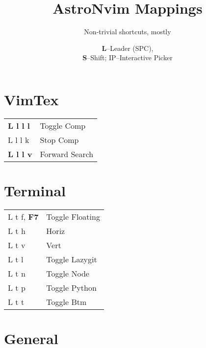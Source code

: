 \documentclass[
  ,landscape
  ,columns=4
]{cheatsheet}
\title{AstroNvim Mappings}
\author{Non-trivial shortcuts, mostly}
\date{\textbf{L}--Leader (SPC),\\\textbf{S}--Shift; IP--Interactive Picker}
\begin{document}
\maketitle

\section{VimTex}

\begin{tabular}{ll}
	\textbf{L l l l} & Toggle Comp    \\
	L l l k          & Stop Comp      \\
	\textbf{L l l v} & Forward Search \\
\end{tabular}

\section{Terminal}

\begin{tabular}{ll}
	L t f, \textbf{F7} & Toggle Floating \\
	L t h              & Horiz           \\
	L t v              & Vert            \\
	L t l              & Toggle Lazygit  \\
	L t n              & Toggle Node     \\
	L t p              & Toggle Python   \\
	L t t              & Toggle Btm      \\
\end{tabular}

\section{General}
\end{document}
